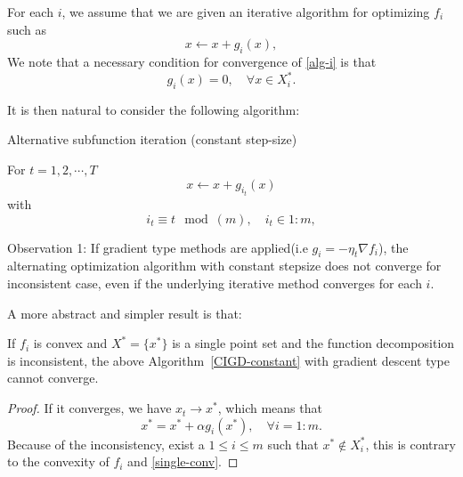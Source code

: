 For each $i$, we assume that we are given an iterative algorithm for
optimizing $f_i$ such as
\begin{equation}
\label{alg-i}
x\leftarrow x+g_i(x),
\end{equation}
We note that a necessary condition for convergence of \eqref{alg-i} is
that 
\begin{equation}\label{single-conv}
g_i(x) = 0, \quad\forall x \in X_i^*.
\end{equation}

It is then natural to consider the following algorithm:
\begin{algorithm}\caption{Alternative subfunction iteration (constant step-size)}\label{CIGD-constant}
	For $t = 1,2,\cdots, T$
	$$
	x\leftarrow x+  g_{i_t}(x)
	$$
	with
	$$
	i_t \equiv t \mod(m), \quad i_t \in 1:m,
	$$
\end{algorithm}

Observation 1:  If gradient type methods are applied(i.e $g_i = -\eta_t \nabla f_i$), the alternating optimization algorithm with constant stepsize does not
converge for inconsistent case, even if the underlying iterative method converges for each
$i$.  

\begin{comment}
There is a counter example(see Bertsekas's book ``Convex optimization
algorithms" in chapter 2.1.5) that: $m=3$ and
$$
f_i = (c_i \cdot x + b_i)^2,
$$
with $c_i, x \in \mathbb{R}^2$ and $b_i \in \mathbb{R}$ with $i \in 1:m$.
\begin{theorem}
There exist some choices of  $c_i, b_i$ such that this system is inconsistent and this Algorithm~\ref{CIGD-constant} does not converge with any constant step-size. 
\end{theorem}
\end{comment}
A more abstract and simpler result is that:
\begin{theorem}
	If $f_i$ is convex and $X^* = \{x^*\}$ is a single point set and the
	function decomposition is inconsistent, the above
	Algorithm~\ref{CIGD-constant} with gradient descent type cannot
	converge.
\end{theorem}
\begin{proof}
	If it converges, we have $x_t \to x^* $, which means that 
	$$
	x^* = x^* + \alpha g_i(x^*), \quad \forall i = 1:m.
	$$
	Because of the inconsistency, exist a $1 \le i \le m$ such
	that $x^* \notin X_i^*$, this is contrary to the convexity of
	$f_i$ and \ref{single-conv}.
\end{proof}


